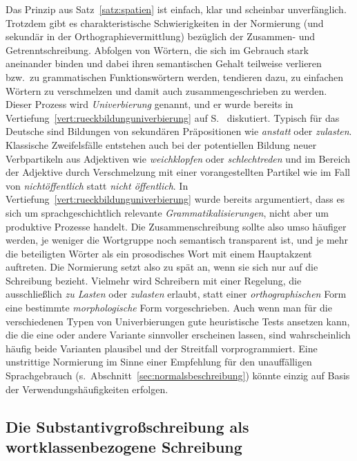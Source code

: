 Das Prinzip aus Satz~\ref{satz:spatien} ist einfach, klar und scheinbar unverfänglich.
Trotzdem gibt es charakteristische Schwierigkeiten in der Normierung (und sekundär in der Orthographievermittlung) bezüglich der Zusammen- und Getrenntschreibung.
Abfolgen von Wörtern, die sich im Gebrauch stark aneinander binden und dabei ihren semantischen Gehalt teilweise verlieren bzw.\ zu grammatischen Funktionswörtern werden, tendieren dazu, zu einfachen Wörtern zu verschmelzen und damit auch zusammengeschrieben zu werden.
Dieser Prozess wird \textit{Univerbierung} genannt, und er wurde bereits in Vertiefung~\ref{vert:rueckbildunguniverbierung} auf S.~\pageref{vert:rueckbildunguniverbierung} diskutiert.
Typisch für das Deutsche sind \zB Bildungen von sekundären Präpositionen wie \textit{anstatt} oder \textit{zulasten}.
Klassische Zweifelsfälle entstehen auch bei der potentiellen Bildung neuer Verbpartikeln aus Adjektiven wie \textit{weichklopfen} oder \textit{schlechtreden} und im Bereich der Adjektive durch Verschmelzung mit einer vorangestellten Partikel wie im Fall von \textit{nichtöffentlich} statt \textit{nicht öffentlich}.
In Vertiefung~\ref{vert:rueckbildunguniverbierung} wurde bereits argumentiert, dass es sich um sprachgeschichtlich relevante \textit{Grammatikalisierungen}, nicht aber um produktive Prozesse handelt.
Die Zusammenschreibung sollte also umso häufiger werden, je weniger die Wortgruppe noch semantisch transparent ist, und je mehr die beteiligten Wörter als ein prosodisches Wort mit einem Hauptakzent auftreten.
Die Normierung setzt also zu spät an, wenn sie sich nur auf die Schreibung bezieht.
Vielmehr wird Schreibern mit einer Regelung, die \zB ausschließlich \textit{zu Lasten} oder \textit{zulasten} erlaubt, statt einer \textit{orthographischen} Form eine bestimmte \textit{morphologische} Form vorgeschrieben.
Auch wenn man für die verschiedenen Typen von Univerbierungen gute heuristische Tests ansetzen kann, die die eine oder andere Variante sinnvoller erscheinen lassen, sind wahrscheinlich häufig beide Varianten plausibel und der Streitfall vorprogrammiert.
Eine unstrittige Normierung im Sinne einer Empfehlung für den unauffälligen Sprachgebrauch (s.\ Abschnitt~\ref{sec:normalsbeschreibung}) könnte einzig auf Basis der Verwendungshäufigkeiten erfolgen.

\subsection{Die Substantivgroßschreibung als wortklassenbezogene Schreibung}
\label{sec:diesubstantivgrossschreibungalswortklassenbezogeneschreibung}

